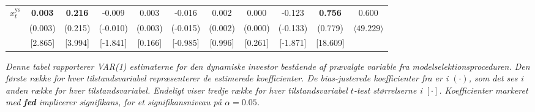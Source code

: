 \documentclass[
  a4paper,
  oneside]{memoir}
\begin{document}
\begin{table}[H]
{\begin{threeparttable}
\begin{tabular}[t]{ccccccccccc}
$x_t^{\text{ys}}$ & \textbf{ 0.003} & \textbf{ 0.216} & -0.009 & 0.003 & -0.016 & 0.002 & 0.000 & -0.123 & \textbf{ 0.756} & 0.600\\
 
\rowcolor{gray!6}   & (0.003) & (0.215) & (-0.010) & (0.003) & (-0.015) & (0.002) & (0.000) & (-0.133) & (0.779) & $\langle49.229\rangle$\\
 
 & [2.865] & [3.994] & [-1.841] & [0.166] & [-0.985] & [0.996] & [0.261] & [-1.871] & [18.609] & \\
\bottomrule
\end{tabular}
\begin{tablenotes}
\item \textit{Denne tabel rapporterer VAR(1) estimaterne for den dynamiske investor bestående af prævalgte variable fra modelselektionsproceduren. Den første række for hver tilstandsvariabel repræsenterer de estimerede koefficienter. De bias-justerede koefficienter fra \citep{Pope1990} er i $(\cdot)$, som det ses i anden række for hver tilstandsvariabel. Endeligt viser tredje række for hver tilstandsvariabel $t$-test størrelserne i $[\cdot]$. Koefficienter markeret med \textbf{fed} implicerer signifikans, for et signifikansniveau på $\alpha=0.05$.}
\end{tablenotes}
\end{threeparttable}}
\end{table}
\end{document}
